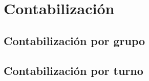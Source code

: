 \section{Contabilización}
\subsection{Contabilización por grupo}
\subsection{Contabilización por turno}